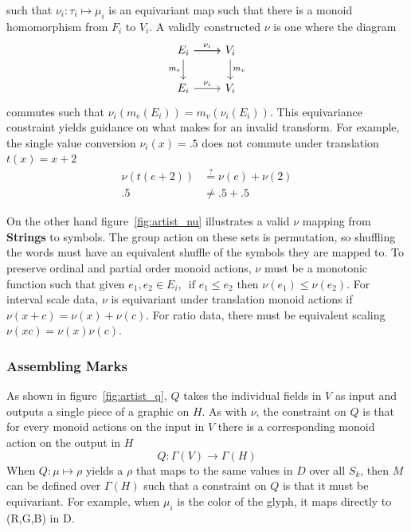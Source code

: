 \documentclass[../main.tex]{subfiles}
\begin{document}
such that $\nu_i: \tau_i \mapsto \mu_i$ is an equivariant map such that there is a monoid homomorphism from $F_{i}$ to $V_{i}$. A validly constructed $\nu$ is one where the  diagram 
\begin{equation}
    \label{eq:nu_categorical}
\begin{tikzcd}
    E_i \arrow[r] \arrow[r, "\nu_i"] \arrow[d, "m_e"'] & V_i \arrow[d, "m_v"] \\
    E_i \arrow[r, "\nu_i"]                           & V_i               
\end{tikzcd}
\end{equation}
commutes such that $\nu_i(m_e(E_i)) = m_v(\nu_i(E_i))$. This equivariance constraint yields guidance on what makes for an invalid transform. For example, the single value conversion $\nu_{i}(x) = .5$ does not commute under translation  $t(x) = x+2$  
\begin{align}
    \nu(t(e + 2)) & \overset{?}{=} \nu(e) + \nu(2)\\
    .5 &\neq .5 + .5
\end{align}

On the other hand figure~\ref{fig:artist_nu} illustrates a valid $\nu$ mapping from \textbf{Strings} to symbols. The group action on these sets is permutation, so shuffling the words must have an equivalent shuffle of the symbols they are mapped to. To preserve ordinal and partial order monoid actions, $\nu$ must be a monotonic function such that given $e_1, e_2 \in E_{i}$, $\text{ if } e_1 \leq e_2 \text{ then } \nu(e_1) \leq \nu(e_2)$. For interval scale data, $\nu$ is equivariant under translation monoid actions if $\nu(x + c) = \nu(x) + \nu(c)$. For ratio data, there must be equivalent scaling $ \nu(xc) = \nu(x)\nu(c)$.

\subsubsection{Assembling Marks}
\label{sec:artist_q}

As shown in figure~\ref{fig:artist_q}, $Q$ takes the individual fields in $V$ as input and outputs a single piece of a graphic on $H$. As with $\nu$, the constraint on $Q$ is that for every monoid actions on the input in $V$ there is a corresponding monoid action on the output in $H$
\begin{equation}
    Q: \Gamma(V) \rightarrow \Gamma(H)
\end{equation}
When $Q: \mu \mapsto \rho$ yields a $\rho$ that maps to the same values in $D$ over all $S_k$, then $M$ can be defined over $\Gamma(H)$ such that a constraint on $Q$ is that it must be equivariant. For example, when $\mu_{i}$ is the color of the glyph, it maps directly to (R,G,B) in D.
\end{document}
